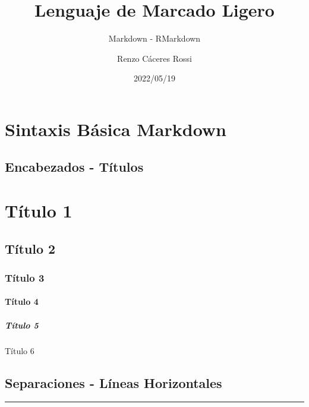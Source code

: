 \documentclass[
]{article}
\title{Lenguaje de Marcado Ligero}
\subtitle{Markdown - RMarkdown}
\author{Renzo Cáceres Rossi}
\date{2022/05/19}
\begin{document}
\maketitle

\hypertarget{sintaxis-buxe1sica-markdown}{%
\section{Sintaxis Básica Markdown}\label{sintaxis-buxe1sica-markdown}}

\hypertarget{encabezados---tuxedtulos}{%
\subsection{Encabezados - Títulos}\label{encabezados---tuxedtulos}}

\hypertarget{tuxedtulo-1}{%
\section{Título 1}\label{tuxedtulo-1}}

\hypertarget{tuxedtulo-2}{%
\subsection{Título 2}\label{tuxedtulo-2}}

\hypertarget{tuxedtulo-3}{%
\subsubsection{Título 3}\label{tuxedtulo-3}}

\hypertarget{tuxedtulo-4}{%
\paragraph{Título 4}\label{tuxedtulo-4}}

\hypertarget{tuxedtulo-5}{%
\subparagraph{Título 5}\label{tuxedtulo-5}}

Título 6

\hypertarget{separaciones---luxedneas-horizontales}{%
\subsection{Separaciones - Líneas
Horizontales}\label{separaciones---luxedneas-horizontales}}

\begin{center}\rule{0.5\linewidth}{0.5pt}\end{center}
\end{document}
